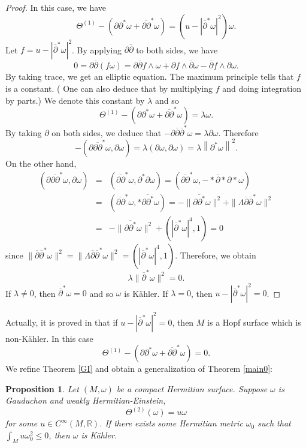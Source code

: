 \documentclass[12pt]{amsart}
\newcommand\bp{{\bar\partial}}
\theoremstyle{plain}
\newtheorem{prop}[thm]{Proposition}
\theoremstyle{definition}
\newcommand{\bproposition}{\begin{prop}}
\newcommand{\eproposition}{\end{prop}}
\newcommand{\bproof}{\begin{proof}}
\newcommand{\eproof}{\end{proof}}
\newcommand{\p}{\partial}
\renewcommand{\bar}{\overline}
\newcommand{\beq}{\begin{equation}}
\newcommand{\eeq}{\end{equation}}
\newcommand{\ee}{\end{eqnarray*}}
\newcommand{\be}{\begin{eqnarray*}}
\renewcommand{\bp}{\bar{\partial}}
\renewcommand{\>}{\rightarrow}
\newcommand{\R}{{\mathbb R}}
\numberwithin{equation}{section} %
\begin{document}
	\bproof In this case, we have 
	\beq \Theta^{(1)}-\left(\partial \partial^{*} \omega+\overline{\partial \partial}^{*} \omega\right)=\left( u-|\bp^*\omega|^2\right)\omega. \eeq 
	Let $f=u-|\bp^*\omega|^2$. By applying $\p\bp$ to both sides, we have 
	\beq 0=\p\bp(f\omega)=\p\bp f\wedge \omega+\p f\wedge \bp\omega-\bp f\wedge \p\omega. \eeq 
	By taking trace, we get an elliptic equation. The maximum principle tells that $f$ is a constant. ( One can also deduce that by multiplying $f$ and doing integration by parts.) We denote this constant by $\lambda$ and so 
	$$\Theta^{(1)}-\left(\partial \partial^{*} \omega+\overline{\partial \partial}^{*} \omega\right)=\lambda \omega.$$
By taking $\p$ on both sides, we deduce that $-\p\bp\bp^*\omega=\lambda\p\omega$.
Therefore $$-\left(\partial \overline{\partial \partial}^{*} \omega, \partial \omega\right)=\lambda(\partial \omega, \partial \omega)=\lambda\left\|\partial^{*} \omega\right\|^2.$$ On the other hand,
\be
\left(\partial \overline{\partial \partial}^{*} \omega, \partial \omega\right)&=&\left(\overline{\partial \partial}^{*} \omega, \partial^{*} \partial \omega\right)=\left(\overline{\partial \partial}^{*} \omega,-* \bar{\partial} * \partial * \omega\right) \\
&=&\left(\overline{\partial \partial}^{*} \omega, * \overline{\partial \partial^{*}} \omega\right)=-\|\overline{\partial \partial^{*}} \omega\|^2+\|\Lambda\bp\bp^*\omega\|^2 \\
&=&-\|\overline{\partial \partial^{*}} \omega\|^2+\left(|\overline{\partial}^{*} \omega|^4, 1\right)=0
\ee 
since  $\|\bp\bp^*\omega\|^2=\|\Lambda\bp\bp^*\omega\|^2=\left(|\overline{\partial}^{*} \omega|^4, 1\right)$. Therefore, we obtain
	\beq\lambda \|\bp^*\omega\|^2=0.\eeq 
If $\lambda\neq 0$, then $\bp^*\omega=0$ and so $\omega$ is K\"ahler. If $\lambda=0$, then 	$u-|\bp^*\omega|^2=0$.
	\eproof 


\noindent 	Actually, it is proved in \cite{Gauduchon1995} that if $u-|\bp^*\omega|^2=0$, then $M$ is a Hopf surface which is non-K\"ahler. In this case 
\beq  \Theta^{(1)}-\left(\partial \partial^{*} \omega+\overline{\partial \partial}^{*} \omega\right)=0.\eeq 
We refine Theorem \ref{GI} and obtain a generalization of Theorem \ref{main0}:

\bproposition\label{generalGI}   Let $(M,\omega)$ be a compact Hermitian surface. Suppose $\omega$ is  Gauduchon and weakly Hermitian-Einstein,
\beq \Theta^{(2)}(\omega)=u \omega \eeq 
for some $u\in C^\infty(M,\R)$.  If there exists some Hermitian metric $\omega_0$ such that $\int_M u\omega_0^2\leq 0$, then $\omega$ is K\"ahler.
\eproposition
	
\end{document}
